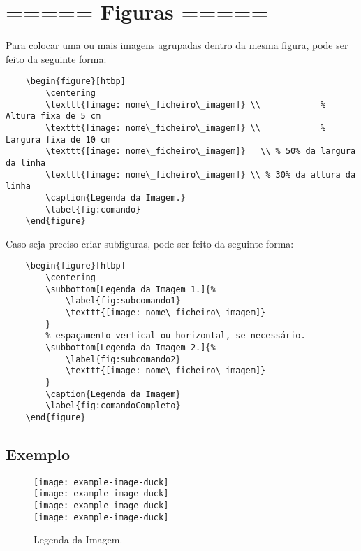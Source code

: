 \section{===== Figuras =====}

Para colocar uma ou mais imagens agrupadas dentro da mesma figura, pode ser feito da seguinte forma:

\begin{verbatim}
    \begin{figure}[htbp]
        \centering
        \texttt{[image: nome\_ficheiro\_imagem]} \\            % Altura fixa de 5 cm
        \texttt{[image: nome\_ficheiro\_imagem]} \\            % Largura fixa de 10 cm
        \texttt{[image: nome\_ficheiro\_imagem]}   \\ % 50% da largura da linha
        \texttt{[image: nome\_ficheiro\_imagem]} \\ % 30% da altura da linha
        \caption{Legenda da Imagem.}
        \label{fig:comando}
    \end{figure}
\end{verbatim}

Caso seja preciso criar subfiguras, pode ser feito da seguinte forma:

\begin{verbatim}
    \begin{figure}[htbp]
        \centering
        \subbottom[Legenda da Imagem 1.]{%
            \label{fig:subcomando1}
            \texttt{[image: nome\_ficheiro\_imagem]}
        }
        % espaçamento vertical ou horizontal, se necessário.
        \subbottom[Legenda da Imagem 2.]{%
            \label{fig:subcomando2}
            \texttt{[image: nome\_ficheiro\_imagem]}
        }
        \caption{Legenda da Imagem}
        \label{fig:comandoCompleto}
    \end{figure}
\end{verbatim}

\subsection{Exemplo}

\begin{figure}[htbp]
    \centering
    \texttt{[image: example-image-duck]} \\            %
    \texttt{[image: example-image-duck]} \\            %
    \texttt{[image: example-image-duck]}   \\ %
    \texttt{[image: example-image-duck]} \\ %
    \caption{Legenda da Imagem.}
    \label{fig:comando}
\end{figure}


